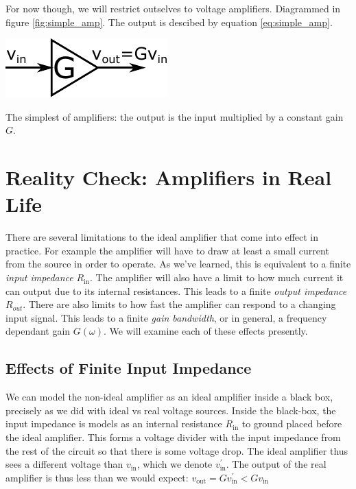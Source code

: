 \documentclass{tufte-book}
\begin{document}
\noindent For now though, we will restrict outselves to voltage amplifiers. Diagrammed in figure \ref{fig:simple_amp}. The output is descibed by equation \ref{eq:simple_amp}.

\begin{marginfigure}%
  \includegraphics[width=\linewidth]{SimpleAmplifier}
  \caption{The simplest of amplifiers: the output is the input multiplied by a constant gain $G$.}
  \label{fig:simple_amp}
\end{marginfigure}

\section{Reality Check: Amplifiers in Real Life}
There are several limitations to the ideal amplifier that come into effect in practice. For example the amplifier will have to draw at least a small current from the source in order to operate. As we've learned, this is equivalent to a finite \textit{input impedance} $R_\text{in}$. The amplifier will also have a limit to how much current it can output due to its internal resistances. This leads to a finite \textit{output impedance} $R_{out}$. There are also limits to how fast the amplifier can respond to a changing input signal. This leads to a finite \textit{gain bandwidth}, or in general, a frequency dependant gain $G(\omega)$. We will examine each of these effects presently.

\subsection{Effects of Finite Input Impedance}
\label{sec:AMP_effect_input}
We can model the non-ideal amplifier as an ideal amplifier inside a black box, precisely as we did with ideal vs real voltage sources. Inside the black-box, the input impedance is models as an internal resistance $R_\text{in}$ to ground placed before the ideal amplifier. This forms a voltage divider with the input impedance from the rest of the circuit so that there is some voltage drop. The ideal amplifier thus sees a different voltage than $v_\text{in}$, which we denote $v^\prime_\text{in}$. The output of the real amplifier is thus less than we would expect: $v_\text{out} = Gv^\prime_\text{in} < Gv_\text{in}$
\end{document}
